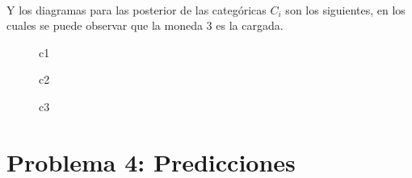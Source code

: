 ~\\
Y los diagramas para las posterior de las categóricas $C_{i}$ son los siguientes, en los cuales se puede 
observar que la moneda 3 es la cargada.


\begin{figure}[h!]
  \caption{c1}
\end{figure}

\begin{figure}[h!]
  \caption{c2}
\end{figure}

\begin{figure}[h!]
  \caption{c3}
\end{figure}


\clearpage

\section{Problema 4: Predicciones}

